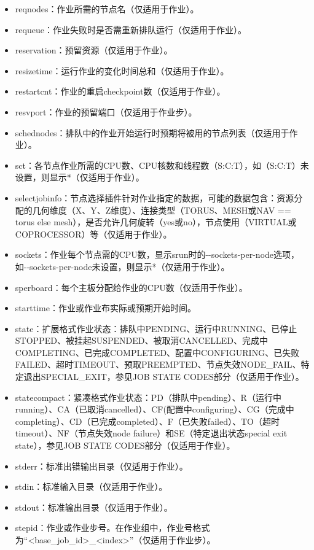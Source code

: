 \begin{itemize}
\begin{itemize}
\begin{itemize}
   	\item reqnodes：作业所需的节点名（仅适用于作业）。
    \item requeue：作业失败时是否需重新排队运行（仅适用于作业）。
    \item reservation：预留资源（仅适用于作业）。
    \item resizetime：运行作业的变化时间总和（仅适用于作业）。
    \item restartcnt：作业的重启checkpoint数（仅适用于作业）。
    \item resvport：作业的预留端口（仅适用于作业步）。
    \item schednodes：排队中的作业开始运行时预期将被用的节点列表（仅适用于作业）。
    \item sct：各节点作业所需的CPU数、CPU核数和线程数（S:C:T），如（S:C:T）未设置，则显示*（仅适用于作业）。
    \item selectjobinfo：节点选择插件针对作业指定的数据，可能的数据包含：资源分配的几何维度（X、Y、Z维度）、连接类型（TORUS、MESH或NAV == torus else mesh），是否允许几何旋转（yes或no），节点使用（VIRTUAL或COPROCESSOR）等（仅适用于作业）。
    \item sockets：作业每个节点需的CPU数，显示srun时的-{}-sockets-per-node选项，如-{}-sockets-per-node未设置，则显示*（仅适用于作业）。
    \item sperboard：每个主板分配给作业的CPU数（仅适用于作业）。
    \item starttime：作业或作业布实际或预期开始时间。
    \item state：扩展格式作业状态：排队中PENDING、运行中RUNNING、已停止STOPPED、被挂起SUSPENDED、被取消CANCELLED、完成中COMPLETING、已完成COMPLETED、配置中CONFIGURING、已失败FAILED、超时TIMEOUT、预取PREEMPTED、节点失效NODE\_FAIL、特定退出SPECIAL\_EXIT，参见JOB STATE CODES部分（仅适用于作业）。
    \item statecompact：紧凑格式作业状态：PD（排队中pending）、R（运行中running）、CA（已取消cancelled）、CF(配置中configuring）、CG（完成中completing）、CD（已完成completed）、F（已失败failed）、TO（超时timeout）、NF（节点失效node failure）和SE（特定退出状态special exit state），参见JOB STATE CODES部分（仅适用于作业）。
    \item stderr：标准出错输出目录（仅适用于作业）。
    \item stdin：标准输入目录（仅适用于作业）。
    \item stdout：标准输出目录（仅适用于作业）。
    \item stepid：作业或作业步号。在作业组中，作业号格式为``<base\_job\_id>\_<index>''（仅适用于作业步）。

\end{itemize}
\end{itemize}
\end{itemize}
